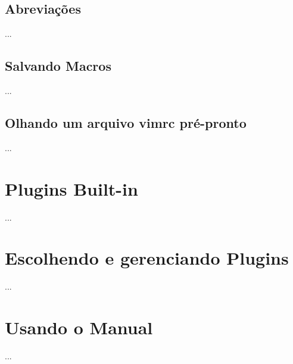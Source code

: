 \documentclass[a4paper, 12pt]{article}
\begin{document}
\subsection{Abreviações}
...
\subsection{Salvando Macros}
...
\subsection{Olhando um arquivo vimrc pré-pronto}
...
\newpage
\section{Plugins Built-in}
...

\newpage
\section{Escolhendo e gerenciando Plugins}
...

\newpage
\section{Usando o Manual}
...
\newpage
\end{document}
